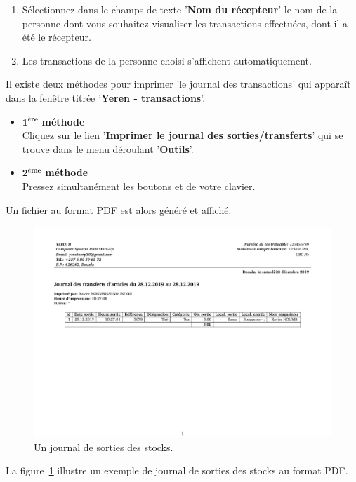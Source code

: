 \begin{enumerate}[1)]
	\item S\'electionnez dans le champs de texte
	'\textbf{Nom du r\'ecepteur}' le nom de la
	personne dont vous souhaitez visualiser
	les transactions effectu\'ees, dont il a \'et\'e
	le r\'ecepteur.
	
	\item Les transactions de la personne choisi
	s'affichent automatiquement.
\end{enumerate}



Il existe deux m\'ethodes pour imprimer 'le journal des
transactions' qui appara\^it dans la fen\^etre titr\'ee
'\textbf{Yeren - transactions}'.

\begin{itemize}[]
	\item \textcolor{purplish}{$\mathbf{1^{\text{\`ere}}}$ \textbf{m\'ethode}}\\
		Cliquez sur le lien
		'\textbf{Imprimer le journal des sorties/transferts}'
		qui se trouve dans le menu d\'eroulant '\textbf{Outils}'.\\

	\item \textcolor{purplish}{$\mathbf{2^{\text{\`eme}}}$ \textbf{m\'ethode}}\\
		Pressez simultan\'ement les boutons 
		et  de votre clavier.
\end{itemize}

Un fichier au format PDF est alors g\'en\'er\'e et affich\'e.

\begin{figure}[!htbp]
	\centering
	\includegraphics[scale=0.55]{images/yeren-journal-sortie-stocks-2017-06-14.pdf}
	\caption{Un journal de sorties des stocks.}
	\label{fig:yeren-journal-sorties-des-stocks}
\end{figure}

La figure~\ref{fig:yeren-journal-sorties-des-stocks} illustre un
exemple de journal de sorties des stocks au format PDF.


